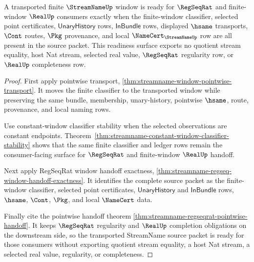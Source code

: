 \begin{theorem}
\label{thm:streamname-finite-window-transport-regseqrat-real-readiness}
A transported finite $\StreamNameUp$ window is ready for $\RegSeqRat$ and finite-window $\RealUp$ consumers exactly when the finite-window classifier, selected point certificates, $\mathsf{UnaryHistory}$ rows, $\mathsf{InBundle}$ rows, displayed $\hsame$ transports, $\Cont$ routes, $\Pkg$ provenance, and local $\NameCert_{\StreamNameUp}$ row are all present in the source packet. This readiness surface exports no quotient stream equality, host Nat stream, selected real value, $\RegSeqRat$ regularity row, or $\RealUp$ completeness row.
\end{theorem}
\begin{proof}
First apply pointwise transport, \autoref{thm:streamname-window-pointwise-transport}. It moves the finite classifier to the transported window while preserving the same bundle, membership, unary-history, pointwise $\hsame$, route, provenance, and local naming rows.

Use constant-window classifier stability when the selected observations are constant endpoints. Theorem~\ref{thm:streamname-constant-window-classifier-stability} shows that the same finite classifier and ledger rows remain the consumer-facing surface for $\RegSeqRat$ and finite-window $\RealUp$ handoff.

Next apply RegSeqRat window handoff exactness, \autoref{thm:streamname-regseq-window-handoff-exactness}. It identifies the complete source packet as the finite-window classifier, selected point certificates, $\mathsf{UnaryHistory}$ and $\mathsf{InBundle}$ rows, $\hsame$, $\Cont$, $\Pkg$, and local $\NameCert$ data.

Finally cite the pointwise handoff theorem \autoref{thm:streamname-regseqrat-pointwise-handoff}. It keeps $\RegSeqRat$ regularity and $\RealUp$ completion obligations on the downstream side, so the transported StreamName source packet is ready for those consumers without exporting quotient stream equality, a host Nat stream, a selected real value, regularity, or completeness.
\end{proof}


